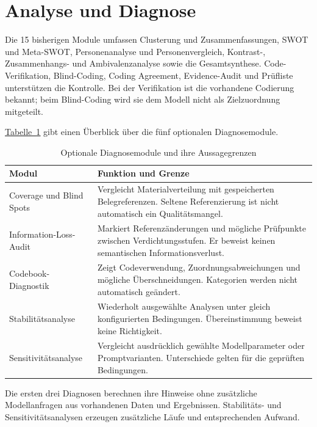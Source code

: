 \documentclass[11pt,a4paper]{article}
\begin{document}
\section*{Analyse und Diagnose}

Die 15 bisherigen Module umfassen Clusterung und Zusammenfassungen, SWOT und Meta-SWOT, Personenanalyse und Personenvergleich, Kontrast-, Zusammenhangs- und Ambivalenzanalyse sowie die Gesamtsynthese. Code-Verifikation, Blind-Coding, Coding Agreement, Evidence-Audit und Prüfliste unterstützen die Kontrolle. Bei der Verifikation ist die vorhandene Codierung bekannt; beim Blind-Coding wird sie dem Modell nicht als Zielzuordnung mitgeteilt.

\newpage
\hyperref[tab:diagnosen]{\uline{Tabelle~\ref*{tab:diagnosen}}} gibt einen Überblick über die fünf optionalen Diagnosemodule.

\begin{table}[H]
\caption{Optionale Diagnosemodule und ihre Aussagegrenzen}
\label{tab:diagnosen}
\begin{tabularx}{\linewidth}{@{}>{\raggedright\arraybackslash}p{3.6cm}X@{}}
\toprule
Modul & Funktion und Grenze \\
\midrule
Coverage und Blind Spots & Vergleicht Materialverteilung mit gespeicherten Belegreferenzen. Seltene Referenzierung ist nicht automatisch ein Qualitätsmangel. \\
Information-Loss-Audit & Markiert Referenzänderungen und mögliche Prüfpunkte zwischen Verdichtungsstufen. Er beweist keinen semantischen Informationsverlust. \\
Codebook-Diagnostik & Zeigt Codeverwendung, Zuordnungsabweichungen und mögliche Überschneidungen. Kategorien werden nicht automatisch geändert. \\
Stabilitätsanalyse & Wiederholt ausgewählte Analysen unter gleich konfigurierten Bedingungen. Übereinstimmung beweist keine Richtigkeit. \\
Sensitivitätsanalyse & Vergleicht ausdrücklich gewählte Modellparameter oder Promptvarianten. Unterschiede gelten für die geprüften Bedingungen. \\
\bottomrule
\end{tabularx}
\end{table}

Die ersten drei Diagnosen berechnen ihre Hinweise ohne zusätzliche Modellanfragen aus vorhandenen Daten und Ergebnissen. Stabilitäts- und Sensitivitätsanalysen erzeugen zusätzliche Läufe und entsprechenden Aufwand.
\end{document}
